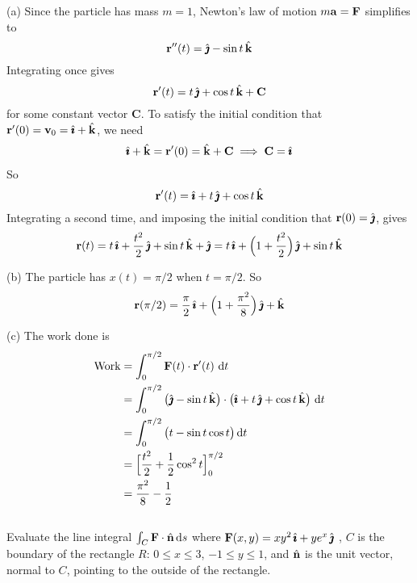 \begin{solution}
(a) Since the particle has mass $m=1$, Newton's law of motion 
$m\mathbf{a}=\mathbf{F}$ simplifies to
\begin{equation*}
\mathbf{r}''(t) = \hat{\pmb{\jmath}} - \sin t\,\hat{\mathbf{k}}
\end{equation*}
Integrating once gives
\begin{equation*}
\mathbf{r}'(t) = t\,\hat{\pmb{\jmath}} + \cos t\,\hat{\mathbf{k}} + \mathbf{C}
\end{equation*}
for some constant vector $\mathbf{C}$.
To satisfy the initial condition that $\mathbf{r}'(0) = \mathbf{v}_0=\hat{\pmb{\imath}}+\hat{\mathbf{k}}$, 
we need
\begin{align*}
\hat{\pmb{\imath}}+\hat{\mathbf{k}} = \mathbf{r}'(0) = \hat{\mathbf{k}} + \mathbf{C}
\implies \mathbf{C} = \hat{\pmb{\imath}}
\end{align*}
So
\begin{equation*}
\vr'(t) %
        = \hi + t\,\hj + \cos t\,\hk 
\end{equation*}
Integrating a second time, and imposing the initial condition that $\mathbf{r}(0)
=\hat{\pmb{\jmath}}$, gives
\begin{equation*}
\mathbf{r}(t)  = t\,\hat{\pmb{\imath}} + \frac{t^2}{2}\,\hat{\pmb{\jmath}} + \sin t\,\hat{\mathbf{k}} +\hat{\pmb{\jmath}}
        = t\,\hat{\pmb{\imath}} +\Big(1+\frac{t^2}{2}\Big)\,\hat{\pmb{\jmath}} + \sin t\,\hat{\mathbf{k}}
\end{equation*}

(b) The particle has $x(t) =\pi/2$ when $t=\pi/2$. So
\begin{equation*}
\mathbf{r}(\pi/2) = \frac{\pi}{2}\,\hat{\pmb{\imath}}  +\Big(1+\frac{\pi^2}{8}\Big)\,\hat{\pmb{\jmath}} + \hat{\mathbf{k}}
\end{equation*}

(c) The work done is
\begin{align*}
\text{Work} &= \int_0^{\pi/2} \mathbf{F}(t)\cdot\mathbf{r}'(t)\ \mathrm{d}t \\
  &= \int_0^{\pi/2} \big(\hat{\pmb{\jmath}} - \sin t\,\hat{\mathbf{k}}\big)\cdot
         \big(\hat{\pmb{\imath}} + t\,\hat{\pmb{\jmath}} + \cos t\,\hat{\mathbf{k}}\big)\ \mathrm{d}t \\
  &= \int_0^{\pi/2} \big(t-\sin t\cos t\big)\,\mathrm{d}t \\
  &= \Big[\frac{t^2}{2} +\frac{1}{2}\cos^2 t\Big]_0^{\pi/2} \\
  & = \frac{\pi^2}{8}-\frac{1}{2}
\end{align*}
\end{solution}



\subsection*{\Application}
\begin{question}[M317 2016D] %
Evaluate the line integral $\int_C \mathbf{F}\cdot\hat{\mathbf{n}}\,\mathrm{d}s$ where
$\mathbf{F}(x,y) = xy^2 \,\hat{\pmb{\imath}} + ye^x \,\hat{\pmb{\jmath}}$ , $C$ is the boundary of the
rectangle $R$: $0 \le x \le 3$, $-1 \le y \le 1$, and  $\hat{\mathbf{n}}$ is the unit vector, normal to $C$, pointing to the outside of the rectangle.
\end{question}

